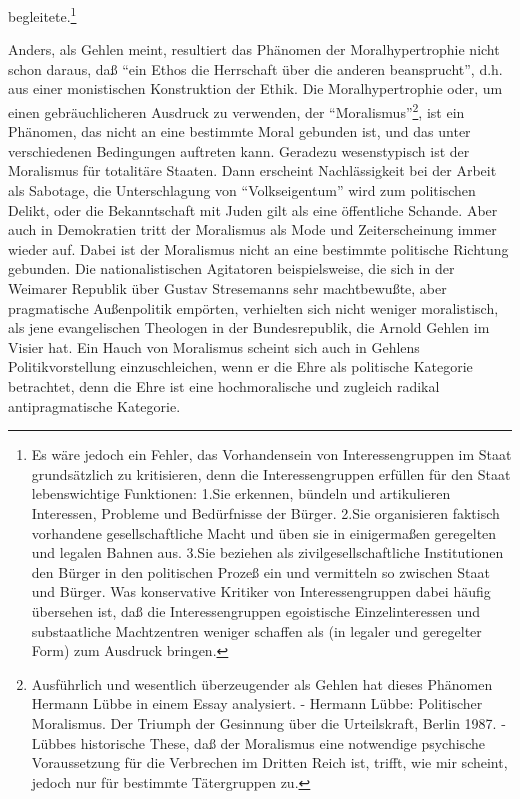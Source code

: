 \documentclass[12pt,a4paper]{article}
\begin{document}
begleitete.\footnote{Es wäre jedoch ein Fehler, das Vorhandensein von
  Interessengruppen im Staat grundsätzlich zu kritisieren, denn die
  Interessengruppen erfüllen für den Staat lebenswichtige Funktionen: 1.Sie
  erkennen, bündeln und artikulieren Interessen, Probleme und Bedürfnisse der
  Bürger. 2.Sie organisieren faktisch vorhandene gesellschaftliche Macht und
  üben sie in einigermaßen geregelten und legalen Bahnen aus. 3.Sie beziehen
  als zivilgesellschaftliche Institutionen den Bürger in den politischen
  Prozeß ein und vermitteln so zwischen Staat und Bürger. Was konservative
  Kritiker von Interessengruppen dabei häufig übersehen ist, daß die
  Interessengruppen egoistische Einzelinteressen und substaatliche
  Machtzentren weniger schaffen als (in legaler und geregelter Form) zum
  Ausdruck bringen.}

Anders, als Gehlen meint, resultiert das Phänomen der Moralhypertrophie nicht
schon daraus, daß "`ein Ethos die Herrschaft über die anderen beansprucht"',
d.h. aus einer monistischen Konstruktion der Ethik. Die Moralhypertrophie
oder, um einen gebräuchlicheren Ausdruck zu verwenden, der
"`Moralismus"'\footnote{Ausführlich und wesentlich überzeugender als Gehlen
  hat dieses Phänomen Hermann Lübbe in einem Essay analysiert. - Hermann
  Lübbe: Politischer Moralismus. Der Triumph der Gesinnung über die
  Urteilskraft, Berlin 1987. - Lübbes historische These, daß der Moralismus
  eine notwendige psychische Voraussetzung für die Verbrechen im Dritten Reich
  ist, trifft, wie mir scheint, jedoch nur für bestimmte Tätergruppen zu.},
ist ein Phänomen, das nicht an eine bestimmte Moral gebunden ist, und das
unter verschiedenen Bedingungen auftreten kann.  Geradezu wesenstypisch ist
der Moralismus für totalitäre Staaten. Dann erscheint Nachlässigkeit bei der
Arbeit als Sabotage, die Unterschlagung von "`Volkseigentum"' wird zum
politischen Delikt, oder die Bekanntschaft mit Juden gilt als eine öffentliche
Schande. Aber auch in Demokratien tritt der Moralismus als Mode und
Zeiterscheinung immer wieder auf. Dabei ist der Moralismus nicht an eine
bestimmte politische Richtung gebunden. Die nationalistischen Agitatoren
beispielsweise, die sich in der Weimarer Republik über Gustav Stresemanns sehr
machtbewußte, aber pragmatische Außenpolitik empörten, verhielten sich nicht
weniger moralistisch, als jene evangelischen Theologen in der Bundesrepublik,
die Arnold Gehlen im Visier hat. Ein Hauch von Moralismus scheint sich auch in
Gehlens Politikvorstellung einzuschleichen, wenn er die Ehre als politische
Kategorie betrachtet, denn die Ehre ist eine hochmoralische und zugleich
radikal antipragmatische Kategorie.
\end{document}
